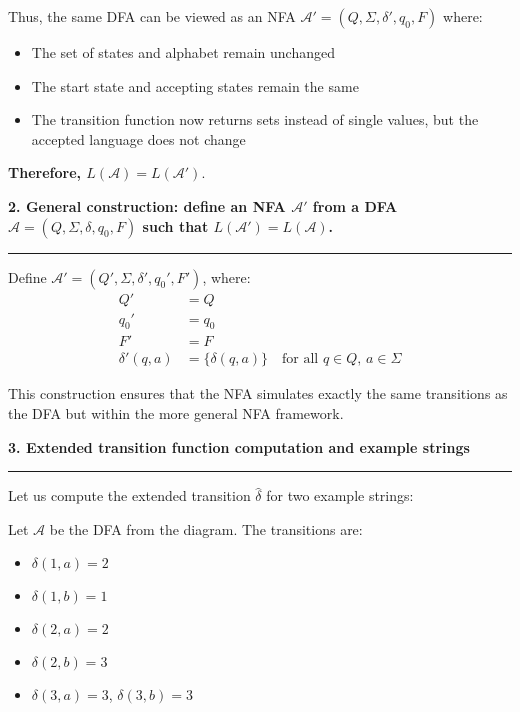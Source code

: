 \documentclass{article}
\theoremstyle{theorem}
\theoremstyle{definition}
\theoremstyle{remark}
\begin{document}
Thus, the same DFA can be viewed as an NFA \( \mathcal{A}' = (Q, \Sigma, \delta', q_0, F) \) where:
\begin{itemize}
    \item The set of states and alphabet remain unchanged
    \item The start state and accepting states remain the same
    \item The transition function now returns sets instead of single values, but the accepted language does not change
\end{itemize}

\textbf{Therefore, \( L(\mathcal{A}) = L(\mathcal{A}') \)}.

\vspace{1em}
\textbf{2. General construction: define an NFA \( \mathcal{A}' \) from a DFA \( \mathcal{A} = (Q, \Sigma, \delta, q_0, F) \) such that \( L(\mathcal{A}') = L(\mathcal{A}) \).}

\vspace{0.5em}
\hrule
\vspace{0.5em}

Define \( \mathcal{A}' = (Q', \Sigma, \delta', q_0', F') \), where:
\begin{align*}
Q' &= Q \\
q_0' &= q_0 \\
F' &= F \\
\delta'(q, a) &= \{ \delta(q, a) \} \quad \text{for all } q \in Q,\, a \in \Sigma
\end{align*}

This construction ensures that the NFA simulates exactly the same transitions as the DFA but within the more general NFA framework.

\vspace{1em}
\textbf{3. Extended transition function computation and example strings}

\vspace{0.5em}
\hrule
\vspace{0.5em}

Let us compute the extended transition \( \hat{\delta} \) for two example strings:

Let \( \mathcal{A} \) be the DFA from the diagram. The transitions are:

\begin{itemize}
    \item \( \delta(1, a) = 2 \)
    \item \( \delta(1, b) = 1 \)
    \item \( \delta(2, a) = 2 \)
    \item \( \delta(2, b) = 3 \)
    \item \( \delta(3, a) = 3 \), \( \delta(3, b) = 3 \)
\end{itemize}
\end{document}
